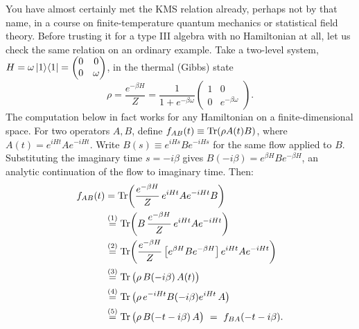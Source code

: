 \begin{physconnect}
You have almost certainly met the KMS relation already, perhaps not by that name, in a course on
finite-temperature quantum mechanics or statistical field theory. Before trusting it for a type III algebra with
no Hamiltonian at all, let us check the same relation on an ordinary example. Take a two-level system,
$H=\omega\ket1\!\bra1 = \begin{pmatrix} 0 & 0 \\ 0 & \omega \end{pmatrix}$, in the thermal (Gibbs) state
\[
\rho = \frac{e^{-\beta H}}{Z} = \frac{1}{1 + e^{-\beta\omega}}
\begin{pmatrix} 1 & 0 \\ 0 & e^{-\beta\omega} \end{pmatrix} .
\]
The computation below in fact works for any Hamiltonian on a finite-dimensional space. For two operators
$A, B$, define $f_{AB}(t) \equiv \operatorname{Tr}(\rho A(t) B)$, where $A(t) = e^{iHt} A e^{-iHt}$. Write
$B(s)\equiv e^{iHs}Be^{-iHs}$ for the same flow applied to $B$. Substituting the imaginary time $s=-i\beta$
gives $B(-i\beta)=e^{\beta H}Be^{-\beta H}$, an analytic continuation of the flow to imaginary time. Then:
\begin{align}
f_{AB}(t) &= \Tr\!\left( \frac{e^{-\beta H}}{Z}\, e^{iHt} A e^{-iHt} B \right) \notag\\
&\eqstep{1} \Tr\!\left( B \, \frac{e^{-\beta H}}{Z}\, e^{iHt} A e^{-iHt} \right) \notag\\
&\eqstep{2} \Tr\!\left( \frac{e^{-\beta H}}{Z} \left[ e^{\beta H} B e^{-\beta H} \right] e^{iHt} A e^{-iHt}
\right) \notag\\
&\eqstep{3} \Tr\big( \rho \, B(-i\beta) \, A(t) \big) \notag\\
&\eqstep{4} \Tr\big( \rho \, e^{-iHt} B(-i\beta) e^{iHt} \, A \big) \notag\\
&\eqstep{5} \Tr\big( \rho \, B(-t - i\beta) \, A \big) \ =\ f_{BA}(-t - i\beta) . \notag
\end{align}
\quad
{}\quad
{}\quad
{}\quad
{}


\end{physconnect}
